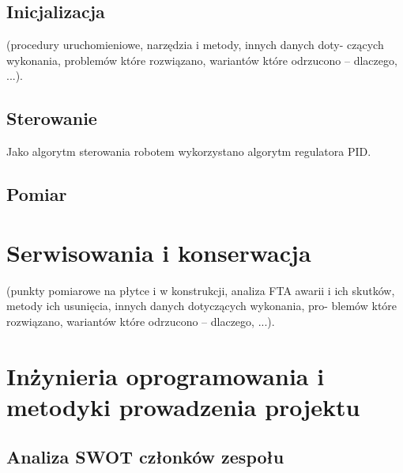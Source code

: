 \documentclass[11pt,a4paper]{article}
\begin{document}
  \subsection{Inicjalizacja} (procedury uruchomieniowe, narzędzia i metody, innych danych doty-
czących wykonania, problemów które rozwiązano, wariantów które odrzucono – dlaczego,
...).
  \subsection{Sterowanie}
  Jako algorytm sterowania robotem wykorzystano algorytm regulatora PID.
  \subsection{Pomiar}  
  
\section{Serwisowania i konserwacja} (punkty pomiarowe na płytce i w konstrukcji, analiza
FTA awarii i ich skutków, metody ich usunięcia, innych danych dotyczących wykonania, pro-
blemów które rozwiązano, wariantów które odrzucono – dlaczego, ...).  

\section{Inżynieria oprogramowania i metodyki prowadzenia projektu}
  \subsection{Analiza SWOT członków zespołu}
  
\vspace{3cm}
\end{document}
